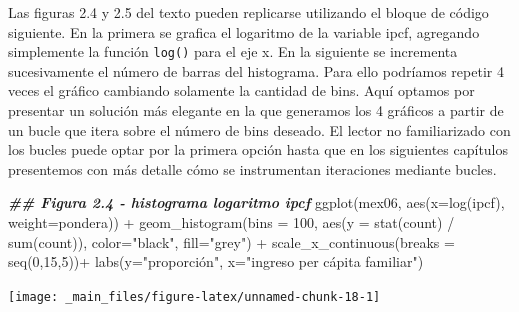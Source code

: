 \documentclass[
]{book}
\newenvironment{Shaded}{\begin{snugshade}}{\end{snugshade}}
\newcommand{\AttributeTok}[1]{\textcolor[rgb]{0.77,0.63,0.00}{#1}}
\newcommand{\DecValTok}[1]{\textcolor[rgb]{0.00,0.00,0.81}{#1}}
\newcommand{\DocumentationTok}[1]{\textcolor[rgb]{0.56,0.35,0.01}{\textbf{\textit{#1}}}}
\newcommand{\FunctionTok}[1]{\textcolor[rgb]{0.00,0.00,0.00}{#1}}
\newcommand{\NormalTok}[1]{#1}
\newcommand{\SpecialCharTok}[1]{\textcolor[rgb]{0.00,0.00,0.00}{#1}}
\newcommand{\StringTok}[1]{\textcolor[rgb]{0.31,0.60,0.02}{#1}}
\begin{document}
Las figuras 2.4 y 2.5 del texto pueden replicarse utilizando el bloque de código siguiente. En la primera se grafica el logaritmo de la variable ipcf, agregando simplemente la función \texttt{log()} para el eje x. En la siguiente se incrementa sucesivamente el número de barras del histograma. Para ello podríamos repetir 4 veces el gráfico cambiando solamente la cantidad de bins. Aquí optamos por presentar un solución más elegante en la que generamos los 4 gráficos a partir de un bucle que itera sobre el número de bins deseado. El lector no familiarizado con los bucles puede optar por la primera opción hasta que en los siguientes capítulos presentemos con más detalle cómo se instrumentan iteraciones mediante bucles.

\begin{Shaded}
\begin{Highlighting}[]
\DocumentationTok{\#\# Figura 2.4 {-} histograma logaritmo ipcf}
\FunctionTok{ggplot}\NormalTok{(mex06, }
       \FunctionTok{aes}\NormalTok{(}\AttributeTok{x=}\FunctionTok{log}\NormalTok{(ipcf), }\AttributeTok{weight=}\NormalTok{pondera)) }\SpecialCharTok{+} 
  \FunctionTok{geom\_histogram}\NormalTok{(}\AttributeTok{bins =} \DecValTok{100}\NormalTok{, }\FunctionTok{aes}\NormalTok{(}\AttributeTok{y =} \FunctionTok{stat}\NormalTok{(count) }\SpecialCharTok{/} \FunctionTok{sum}\NormalTok{(count)),}
                 \AttributeTok{color=}\StringTok{"black"}\NormalTok{, }\AttributeTok{fill=}\StringTok{"grey"}\NormalTok{) }\SpecialCharTok{+}
  \FunctionTok{scale\_x\_continuous}\NormalTok{(}\AttributeTok{breaks =} \FunctionTok{seq}\NormalTok{(}\DecValTok{0}\NormalTok{,}\DecValTok{15}\NormalTok{,}\DecValTok{5}\NormalTok{))}\SpecialCharTok{+}
  \FunctionTok{labs}\NormalTok{(}\AttributeTok{y=}\StringTok{"proporción"}\NormalTok{, }\AttributeTok{x=}\StringTok{"ingreso per cápita familiar"}\NormalTok{)}
\end{Highlighting}
\end{Shaded}

\texttt{[image: \_main\_files/figure-latex/unnamed-chunk-18-1]}
\end{document}
